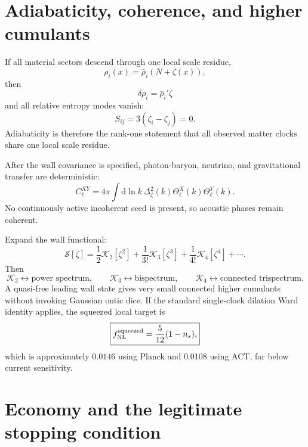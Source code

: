 \documentclass[11pt]{article}
\numberwithin{equation}{section}
\newcommand{\dd}{\mathrm d}
\begin{document}
\section{Adiabaticity, coherence, and higher cumulants}

If all material sectors descend through one local scale residue,
\begin{equation}
\rho_i(x)=\bar\rho_i(N+\zeta(x)),
\end{equation}
then
\begin{equation}
\delta\rho_i=\bar\rho_i'\zeta
\end{equation}
and all relative entropy modes vanish:
\begin{equation}
\boxed{S_{ij}=3(\zeta_i-\zeta_j)=0.}
\end{equation}
Adiabaticity is therefore the rank-one statement that all observed matter clocks share one local scale residue.

After the wall covariance is specified, photon-baryon, neutrino, and gravitational transfer are deterministic:
\begin{equation}
C_\ell^{XY}=4\pi\int\dd\ln k\,\Delta_\zeta^2(k)\Theta_\ell^X(k)\Theta_\ell^Y(k).
\end{equation}
No continuously active incoherent seed is present, so acoustic phases remain coherent.

Expand the wall functional:
\begin{equation}
\mathscr S[\zeta]=\frac12\mathcal K_2[\zeta^2]+\frac1{3!}\mathcal K_3[\zeta^3]+\frac1{4!}\mathcal K_4[\zeta^4]+\cdots.
\end{equation}
Then
\begin{equation}
\mathcal K_2\leftrightarrow\text{power spectrum},\qquad
\mathcal K_3\leftrightarrow\text{bispectrum},\qquad
\mathcal K_4\leftrightarrow\text{connected trispectrum}.
\end{equation}
A quasi-free leading wall state gives very small connected higher cumulants without invoking Gaussian ontic dice. If the standard single-clock dilation Ward identity applies, the squeezed local target is
\begin{equation}
\boxed{f_{\rm NL}^{\rm squeezed}=\frac5{12}(1-n_s),}
\end{equation}
which is approximately $0.0146$ using Planck and $0.0108$ using ACT, far below current sensitivity.

\section{Economy and the legitimate stopping condition}
\end{document}

